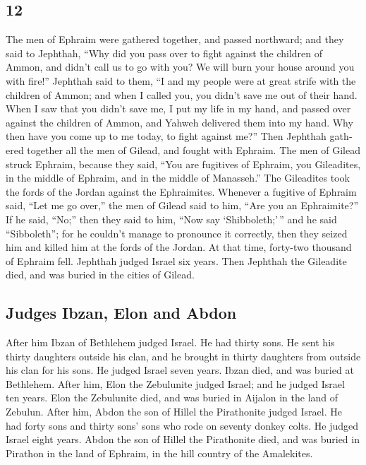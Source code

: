 \begin{paracol}{2}
\begin{otherlanguage}{english}
\hypertarget{section-23}{%
\section{12}\label{section-23}}

 The men of Ephraim were gathered together, and passed
northward; and they said to Jephthah, ``Why did you pass over to fight
against the children of Ammon, and didn't call us to go with you? We
will burn your house around you with fire!''  Jephthah
said to them, ``I and my people were at great strife with the children
of Ammon; and when I called you, you didn't save me out of their hand.
 When I saw that you didn't save me, I put my life in my
hand, and passed over against the children of Ammon, and Yahweh
delivered them into my hand. Why then have you come up to me today, to
fight against me?''  Then Jephthah gathered together all
the men of Gilead, and fought with Ephraim. The men of Gilead struck
Ephraim, because they said, ``You are fugitives of Ephraim, you
Gileadites, in the middle of Ephraim, and in the middle of Manasseh.''
 The Gileadites took the fords of the Jordan against the
Ephraimites. Whenever a fugitive of Ephraim said, ``Let me go over,''
the men of Gilead said to him, ``Are you an Ephraimite?'' If he said,
``No;''  then they said to him, ``Now say
`Shibboleth;'\,'' and he said ``Sibboleth''; for he couldn't manage to
pronounce it correctly, then they seized him and killed him at the fords
of the Jordan. At that time, forty-two thousand of Ephraim fell.
 Jephthah judged Israel six years. Then Jephthah the
Gileadite died, and was buried in the cities of Gilead.

\hypertarget{judges-ibzan-elon-and-abdon}{%
\subsection{Judges Ibzan, Elon and
Abdon}\label{judges-ibzan-elon-and-abdon}}

 After him Ibzan of Bethlehem judged Israel.
 He had thirty sons. He sent his thirty daughters outside
his clan, and he brought in thirty daughters from outside his clan for
his sons. He judged Israel seven years.  Ibzan died, and
was buried at Bethlehem.  After him, Elon the Zebulunite
judged Israel; and he judged Israel ten years.  Elon the
Zebulunite died, and was buried in Aijalon in the land of Zebulun.
 After him, Abdon the son of Hillel the Pirathonite
judged Israel.  He had forty sons and thirty sons' sons
who rode on seventy donkey colts. He judged Israel eight years.
 Abdon the son of Hillel the Pirathonite died, and was
buried in Pirathon in the land of Ephraim, in the hill country of the
Amalekites.


\end{otherlanguage}
\end{paracol}
